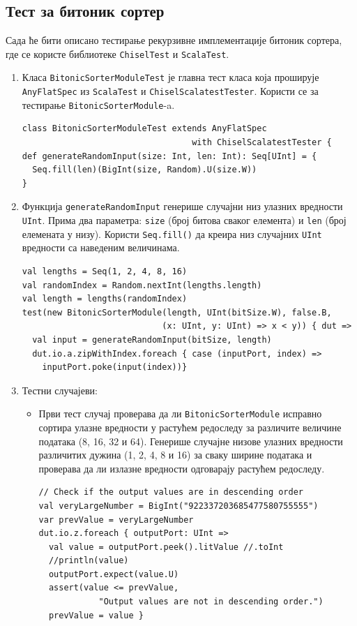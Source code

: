 \documentclass[12pt, a4paper]{article}
\theoremstyle{definition}
\begin{document}
\subsection{Тест за битоник сортер}
Сада ће бити описано тестирање рекурзивне имплементације битоник сортера, где се користе библиотеке \verb+ChiselTest+ и \verb+ScalaTest+.
\begin{enumerate}
 \item Класа \verb+BitonicSorterModuleTest+ је главна тест класа која проширује \verb+AnyFlatSpec+ из \verb+ScalaTest+ и \verb+ChiselScalatestTester+. Користи се за тестирање \verb+BitonicSorterModule+-a.
 \begin{verbatim}
class BitonicSorterModuleTest extends AnyFlatSpec
                                  with ChiselScalatestTester {
def generateRandomInput(size: Int, len: Int): Seq[UInt] = {
  Seq.fill(len)(BigInt(size, Random).U(size.W))
}
 \end{verbatim}
 \item Функција \verb+generateRandomInput+ генерише случајни низ улазних вредности \verb+UInt+. Прима два параметра: \verb+size+ (број битова сваког елемента) и \verb+len+ (број елемената у низу). Користи \verb+Seq.fill()+ да креира низ случајних \verb+UInt+ вредности са наведеним величинама.
 \begin{verbatim}
val lengths = Seq(1, 2, 4, 8, 16)
val randomIndex = Random.nextInt(lengths.length)
val length = lengths(randomIndex)
test(new BitonicSorterModule(length, UInt(bitSize.W), false.B,
                            (x: UInt, y: UInt) => x < y)) { dut =>
  val input = generateRandomInput(bitSize, length)
  dut.io.a.zipWithIndex.foreach { case (inputPort, index) =>
    inputPort.poke(input(index))}
 \end{verbatim}

 \item Тестни случајеви:
 \begin{itemize}
  \item Први тест случај проверава да ли \verb+BitonicSorterModule+ исправно сортира улазне вредности у растућем редоследу за различите величине података (8, 16, 32 и 64). Генерише случајне низове улазних вредности различитих дужина (1, 2, 4, 8 и 16) за сваку ширине података и проверава да ли излазне вредности одговарају растућем редоследу.
  \begin{verbatim}
// Check if the output values are in descending order
val veryLargeNumber = BigInt("922337203685477580755555")
var prevValue = veryLargeNumber
dut.io.z.foreach { outputPort: UInt =>
  val value = outputPort.peek().litValue //.toInt
  //println(value)
  outputPort.expect(value.U)
  assert(value <= prevValue,
            "Output values are not in descending order.")
  prevValue = value }
  \end{verbatim}


\end{itemize}
\end{enumerate}
\end{document}
